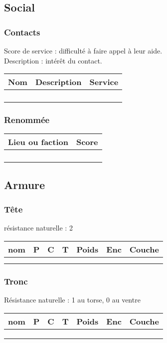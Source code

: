 \documentclass[10pt,a4paper]{article}
\begin{document}
\begin{multicols}{3}
\subsection*{Social}
\subsubsection*{Contacts}
Score de service : difficulté à faire appel à leur aide.\\
Description : intérêt du contact.\\
\begin{tabular}{ccc}
\textbf{Nom}&\textbf{Description}&\textbf{Service}\\
\hline\\
\hline\\
\hline\\
\hline\\
\end{tabular}
\subsubsection*{Renommée}
\begin{tabular}{cc}
\textbf{Lieu ou faction}&\textbf{Score}\\
\hline\\
\hline\\
\hline\\
\hline\\
\end{tabular}
\columnbreak
\subsection*{Armure}
\subsubsection*{Tête}
résistance naturelle : 2\\
\begin{tabular}{c|c|c|c|c|c|c}
\textbf{nom}&\textbf{P}&\textbf{C}&\textbf{T}&\textbf{Poids}&\textbf{Enc}&\textbf{Couche}\\
\hline
& & & & & \\
\hline
& & & & & \\
\end{tabular}
\subsubsection*{Tronc}
Résistance naturelle : 1 au torse, 0 au ventre
\begin{tabular}{c|c|c|c|c|c|c}
\textbf{nom}&\textbf{P}&\textbf{C}&\textbf{T}&\textbf{Poids}&\textbf{Enc}&\textbf{Couche}\\
\hline
& & & & & \\
\hline
& & & & & \\
\hline
& & & & & \\
\end{tabular}

\end{multicols}
\end{document}
